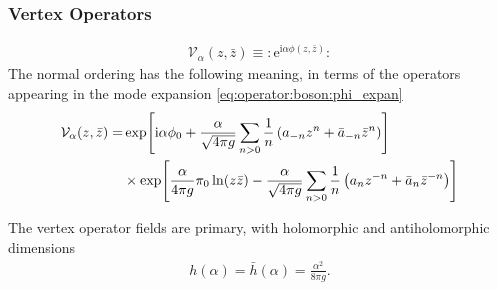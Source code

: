 \documentclass[10pt]{article}
\newcommand{\me}{\mathrm{e}}
\newcommand{\ii}{\mathrm{i}}
\begin{document}
\subsubsection{Vertex Operators}
\begin{align}
    \mathcal{V}_\alpha(z,\bar{z})\equiv:\me^{\ii\alpha\phi(z,\bar{z})}:
\end{align}
The normal ordering has the following meaning, in terms of the operators appearing in the mode expansion \cref{eq:operator:boson:phi_expan}
\begin{align}
    \mathcal{V}_\alpha(z,\bar{z})= & \exp[\ii\alpha\phi_0+\frac{\alpha}{\sqrt{4\pi g}}\sum_{n>0}\frac{1}{n}\left(a_{-n}z^n+\bar{a}_{-n}\bar{z}^n\right)]\notag              \\
                                   & \times\exp[\frac{\alpha}{4\pi g}\pi_0 \ln(z\bar{z})-\frac{\alpha}{\sqrt{4\pi g}}\sum_{n>0}\frac{1}{n}\left(a_n z^{-n}+\bar{a}_n \bar{z}^{-n}\right)]
\end{align}
\begin{claim}
    The vertex operator fields are primary, with holomorphic and antiholomorphic dimensions
    \begin{align}
        h(\alpha)=\bar{h}(\alpha)=\frac{\alpha^2}{8\pi g}.
    \end{align}
\end{claim}
\end{document}
